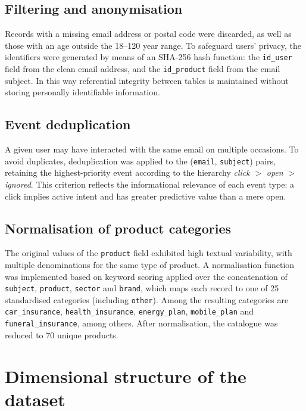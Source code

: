 \subsection{Filtering and anonymisation}

Records with a missing email address or postal code were discarded, as well as those with an age outside the 18--120 year range. To safeguard users' privacy, the identifiers were generated by means of an SHA-256 hash function: the \texttt{id\_user} field from the clean email address, and the \texttt{id\_product} field from the email subject. In this way referential integrity between tables is maintained without storing personally identifiable information.

\subsection{Event deduplication}

A given user may have interacted with the same email on multiple occasions. To avoid duplicates, deduplication was applied to the (\texttt{email}, \texttt{subject}) pairs, retaining the highest-priority event according to the hierarchy \textit{click} $>$ \textit{open} $>$ \textit{ignored}. This criterion reflects the informational relevance of each event type: a click implies active intent and has greater predictive value than a mere open.

\subsection{Normalisation of product categories}

The original values of the \texttt{product} field exhibited high textual variability, with multiple denominations for the same type of product. A normalisation function was implemented based on keyword scoring applied over the concatenation of \texttt{subject}, \texttt{product}, \texttt{sector} and \texttt{brand}, which maps each record to one of 25 standardised categories (including \texttt{other}). Among the resulting categories are \texttt{car\_insurance}, \texttt{health\_insurance}, \texttt{energy\_plan}, \texttt{mobile\_plan} and \texttt{funeral\_insurance}, among others. After normalisation, the catalogue was reduced to 70 unique products.

\section{Dimensional structure of the dataset}

